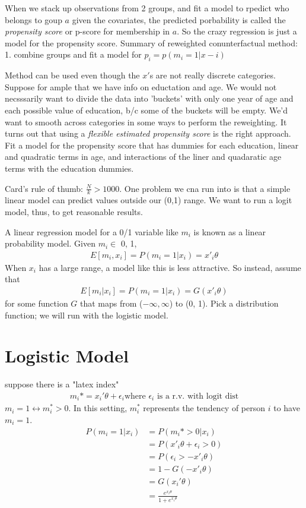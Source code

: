 \documentclass[10pt,a4paper, oneside]{book}
\begin{document}
When we stack up observations from 2 groups, and fit a model to rpedict who belongs to goup $a$ given the covariates, the predicted porbability is called the \textit{propensity score} or p-score for membership in $a$. So the crazy regression is just a model for the propensity score. 
Summary of reweighted conunterfactual method: 1. combine groups and fit a model for $p_i = p(m_i = 1 | x-i)$

Method can be used even though the $x'$s are not really discrete categories. Suppose for ample that we have info on eductation and age. We would not necsssarily want to divide the data into 'buckets' with only one year of age and each possible value of education, b/c some of the buckets will be empty. We'd want to smooth across categories in some ways to perform the reweighting. It turns out that using a \textit{flexible estimated propensity score} is the right approach. Fit a model for the propensity score that has dummies for each education, linear and quadratic terms in age, and interactions of the liner and quadaratic age terms with the education dummies.

Card's rule of thumb: $\frac{N }{k} > 1000$. One problem we cna run into is that a simple linear model can predict values outside our (0,1) range. We want to run a logit model, thus, to get reasonable results.

A linear regression model for a 0/1 variable like $m_i$ is known as a linear probability model. Given $m_i \in$ {0, 1}, 
\begin{align*}
    E[m_i, x_i] = P(m_i = 1 | x_i) = x'_i\theta
\end{align*}
When $x_i$ has a large range, a model like this is less attractive. So instead, assume that
\begin{align*}
    E[m_i|x_i] = P(m_i = 1 | x_i) = G(x'_i\theta)
\end{align*}
for some function $G$ that maps from ($-\infty, \infty$) to (0, 1). Pick a distribution function; we will run with the logistic model.

\section{Logistic Model}
suppose there is a "latex index"
\begin{align*}
    m_i* = x_i'\theta + \epsilon_i \text{where $\epsilon_i$ is a r.v. with logit dist}
\end{align*}
$m_i = 1 \leftrightarrow m_i^{*} > 0$. In this setting, $m_i^*$ represents the tendency of person $i$ to have $m_i = 1$.
\begin{align*}
    P(m_i = 1 | x_i) &= P(m_i* > 0|x_i) \\
                     &= P(x'_i\theta + \epsilon_i > 0)\\
                     &= P(\epsilon_i > -x'_i\theta)\\
                     &= 1 - G(-x'_i\theta)\\
                     &= G(x_i'\theta)\\
                     &= \frac{e^{x_i\theta}}{1+e^{x_i\theta}}
\end{align*} 
\end{document}
